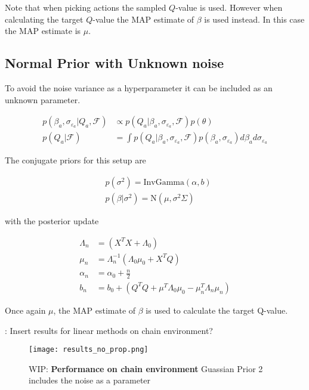 Note that when picking actions the sampled $Q$-value is used. However when calculating the target $Q$-value the MAP estimate of $\beta$ is used instead. In this case the MAP estimate is $\mu$. 

\subsection{Normal Prior with Unknown noise}

To avoid the noise variance as a hyperparameter it can be included as an unknown parameter.

\begin{align*}
    p(\beta_a, \sigma_{\varepsilon_a}|Q_a, \mathcal{F}) &\propto p(Q_a| \beta_a, \sigma_{\varepsilon_a}, \mathcal{F})p(\theta) \\
    p(Q_a|\mathcal{F}) &= \int p(Q_a|\beta_a, \sigma_{\varepsilon_a}, \mathcal{F}) p(\beta_a, \sigma_{\varepsilon_a})d\beta_a d\sigma_{\varepsilon_a}
\end{align*}

The conjugate priors for this setup are

\begin{align*}
    & p(\sigma^2) = \text{InvGamma}(\alpha, b)          \\
    & p(\beta|\sigma^2) = \text{N}(\mu, \sigma^2\Sigma) 
\end{align*}

with the posterior update

\begin{align*}
	\Lambda_n & = (X^TX + \Lambda_0)                                         \\
	\mu_n     & = \Lambda_n^{-1}(\Lambda_0\mu_0 + X^TQ)                      \\
	\alpha_n  & = \alpha_0 + \frac{n}{2}                                     \\
	b_n       & = b_0 + (Q^TQ + \mu^T\Lambda_0\mu_0 - \mu_n^T\Lambda_n\mu_n) 
\end{align*}

Once again $\mu$, the MAP estimate of $\beta$ is used to calculate the target Q-value.

\todo: Insert results for linear methods on chain environment?

\begin{figure}[H]
    \centering
    \texttt{[image: results\_no\_prop.png]}
    \caption{WIP: \textbf{Performance on chain environment} Guassian Prior 2 includes the noise as a parameter}
    \label{fig:results_no_propr}
\end{figure}


